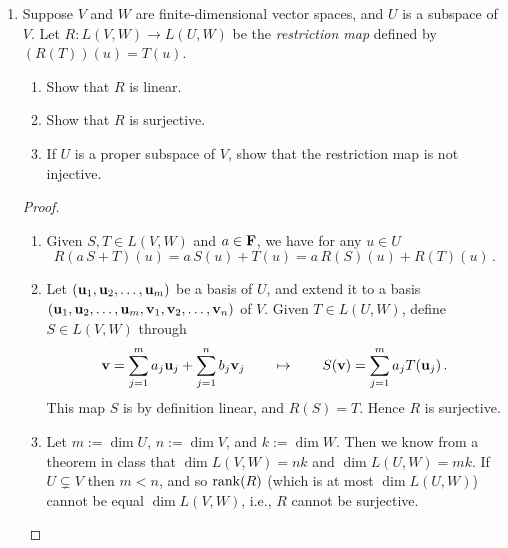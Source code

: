 \documentclass[11pt]{amsart}
\begin{document}
\begin{enumerate}[(1)]
\begin{proof}
Suppose $ST$ is invertible and so, in particular, $\null(ST) = \{ \0 \}$ and $\range(ST) = V$.
We have shown in a previous homework that $\null(T) \subseteq \null(ST) = \{ \0 \}$, and so $T$ is injective and (by a theorem from class) invertible.
We have also shown that $\range(S) \supseteq \range(ST) = V$, and so $S$ is surjective and (by the same theorem) invertible.

An example of how this statement can fail if $V$ is infinite dimensional is given by $V = \P(\R)$, $S(p(x)) = p'(x)$, and $T(p(x)) = \int_0^x p(t) \, dt$: by the Fundamental Theorem of Calculus, $ST$ is the identity map; however, $S$ is not injective.
\end{proof}

\item Suppose $V$ and $W$ are finite-dimensional vector spaces, and $U$ is a subspace of $V$.
Let $R: L(V,W) \to L(U,W)$ be the \emph{restriction map} defined by $(R(T))(u) = T(u)$.
  \begin{enumerate}
  \item Show that $R$ is linear.
  \item Show that $R$ is surjective.
  \item If $U$ is a proper subspace of $V$, show that the restriction map is not injective.
  \end{enumerate}

\begin{proof}
\begin{enumerate}

\item Given $S, T \in L(V,W)$ and $a \in \mathbf{F}$, we have for any $u \in U$
\[
  R(a \, S+T)(u) = a \, S(u) + T(u) = a \, R(S)(u) + R(T)(u) \, .
\]

\item Let $\left( \mathbf u_1, \mathbf u_2, \dots, \mathbf u_m \right)$ be a basis of $U$, and extend it to a basis $\left( \mathbf u_1, \mathbf u_2, \dots, \mathbf u_m, \mathbf v_1, \mathbf v_2, \dots, \mathbf v_n \right)$ of $V$.
Given $T \in L(U,W)$, define $S \in L(V,W)$ through
\[
  \mathbf v = \sum_{ j=1 }^m a_j \mathbf u_j + \sum_{ j=1 }^n b_j \mathbf v_j \qquad \mapsto \qquad S(\mathbf v) = \sum_{ j=1 }^m a_j T(\mathbf u_j) \, .
\]
This map $S$ is by definition linear, and $R(S) = T$.
Hence $R$ is surjective.

\item Let $m := \dim U$, $n := \dim V$, and $k := \dim W$.
Then we know from a theorem in class that $\dim L(V,W) = nk$ and $\dim L(U,W) = mk$.
If $U \subsetneq V$ then $m < n$, and so $\operatorname{rank}(R)$ (which is at most $\dim L(U,W)$) cannot be equal $\dim L(V,W)$, i.e., $R$ cannot be surjective. \qedhere

\end{enumerate}
\end{proof}

\end{enumerate}
\end{document}
